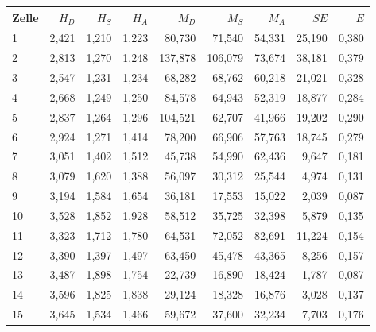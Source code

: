 \begin{center}
    \centering
    \begin{tabular}{lrrrrrrrr}
        \toprule
        Zelle &  $H_D$ &  $H_S$ &  $H_A$ &    $M_D$ &    $M_S$ &   $M_A$ &     $SE$ &     $E$ \\
        \midrule
        1     & 2,421 & 1,210 & 1,223 &  80,730 &  71,540 & 54,331 & 25,190 & 0,380 \\
        2     & 2,813 & 1,270 & 1,248 & 137,878 & 106,079 & 73,674 & 38,181 & 0,379 \\
        3     & 2,547 & 1,231 & 1,234 &  68,282 &  68,762 & 60,218 & 21,021 & 0,328 \\
        4     & 2,668 & 1,249 & 1,250 &  84,578 &  64,943 & 52,319 & 18,877 & 0,284 \\
        5     & 2,837 & 1,264 & 1,296 & 104,521 &  62,707 & 41,966 & 19,202 & 0,290 \\
        6     & 2,924 & 1,271 & 1,414 &  78,200 &  66,906 & 57,763 & 18,745 & 0,279 \\
        7     & 3,051 & 1,402 & 1,512 &  45,738 &  54,990 & 62,436 &  9,647 & 0,181 \\
        8     & 3,079 & 1,620 & 1,388 &  56,097 &  30,312 & 25,544 &  4,974 & 0,131 \\
        9     & 3,194 & 1,584 & 1,654 &  36,181 &  17,553 & 15,022 &  2,039 & 0,087 \\
        10    & 3,528 & 1,852 & 1,928 &  58,512 &  35,725 & 32,398 &  5,879 & 0,135 \\
        11    & 3,323 & 1,712 & 1,780 &  64,531 &  72,052 & 82,691 & 11,224 & 0,154 \\
        12    & 3,390 & 1,397 & 1,497 &  63,450 &  45,478 & 43,365 &  8,256 & 0,157 \\
        13    & 3,487 & 1,898 & 1,754 &  22,739 &  16,890 & 18,424 &  1,787 & 0,087 \\
        14    & 3,596 & 1,825 & 1,838 &  29,124 &  18,328 & 16,876 &  3,028 & 0,137 \\
        15    & 3,645 & 1,534 & 1,466 &  59,672 &  37,600 & 32,234 &  7,703 & 0,176 \\
        \bottomrule
    \end{tabular}
    \label{tab:CY}
\end{center}


